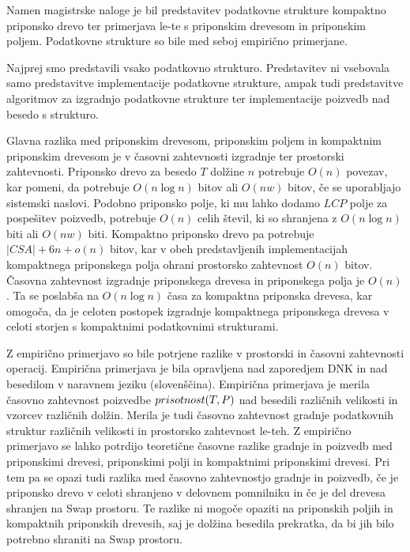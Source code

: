 Namen magistrske naloge je bil predstavitev podatkovne strukture kompaktno priponsko drevo ter primerjava le-te s priponskim drevesom in priponskim poljem. Podatkovne strukture so bile med seboj empirično primerjane.

Najprej smo predstavili vsako podatkovno strukturo. Predstavitev ni vsebovala samo predstavitve implementacije podatkovne strukture, ampak tudi predstavitve algoritmov za izgradnjo podatkovne strukture ter implementacije poizvedb nad besedo s strukturo.

Glavna razlika med priponskim drevesom, priponskim poljem in kompaktnim priponskim drevesom je v časovni zahtevnosti izgradnje ter prostorski zahtevnosti. Priponsko drevo za besedo $T$ dolžine $n$ potrebuje $O(n)$ povezav, kar pomeni, da potrebuje $O(n\log{n})$ bitov ali $O(nw)$ bitov, če se uporabljajo sistemski naslovi. Podobno priponsko polje, ki mu lahko dodamo $LCP$ polje za pospešitev poizvedb, potrebuje $O(n)$ celih števil, ki so shranjena z $O(n\log{n})$ biti ali $O(nw)$ biti. Kompaktno priponsko drevo pa potrebuje $|CSA|+6n+o(n)$ bitov, kar v obeh predstavljenih implementacijah kompaktnega priponskega polja ohrani prostorsko zahtevnost $O(n)$ bitov. Časovna zahtevnost izgradnje priponskega drevesa in priponskega polja je $O(n)$. Ta se poslabša na $O(n\log{n})$ časa za kompaktna priponska drevesa, kar omogoča, da je celoten postopek izgradnje kompaktnega priponskega drevesa v celoti storjen s kompaktnimi podatkovnimi strukturami.

Z empirično primerjavo so bile potrjene razlike v prostorski in časovni zahtevnosti operacij. Empirična primerjava je bila opravljena nad zaporedjem DNK in nad besedilom v naravnem jeziku (slovenščina). Empirična primerjava je merila časovno zahtevnost poizvedbe $ \mathop{prisotnost}(T,P) $ nad besedili različnih velikosti in vzorcev različnih dolžin. Merila je tudi časovno zahtevnost gradnje podatkovnih struktur različnih velikosti in prostorsko zahtevnost le-teh. Z empirično primerjavo se lahko potrdijo teoretične časovne razlike gradnje in poizvedb med priponskimi drevesi, priponskimi polji in kompaktnimi priponskimi drevesi. Pri tem pa se opazi tudi razlika med časovno zahtevnostjo gradnje in poizvedb, če je priponsko drevo v celoti shranjeno v delovnem pomnilniku in če je del drevesa shranjen na Swap prostoru. Te razlike ni mogoče opaziti na priponskih poljih in kompaktnih priponskih drevesih, saj je dolžina besedila prekratka, da bi jih bilo potrebno shraniti na Swap prostoru.

